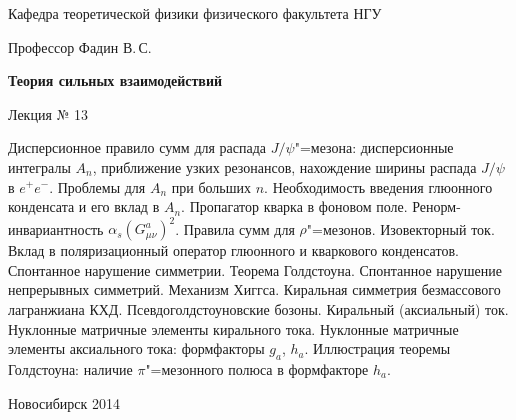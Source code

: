 \documentclass[12pt,pagesize,paper=landscape,paper=192mm:108mm]{scrbook}
\begin{document}
\begin{titlepage}
\begin{center}
    Кафедра теоретической физики физического факультета НГУ

    \large
    Профессор Фадин В.\,С.
    \vspace{-0.5em}

    \huge
    \textbf{Теория сильных взаимодействий}
    
    \Large
    Лекция № 13
    \vfill
    
    \normalsize
    \begin{minipage}{0.95\linewidth}
      \small Дисперсионное правило сумм для распада $J/\psi$"=мезона:
      дисперсионные интегралы $A_n$, приближение узких резонансов,
      нахождение ширины распада $J/\psi$ в $e^+e^-$. Проблемы для
      $A_n$ при больших $n$. Необходимость введения глюонного
      конденсата и его вклад в $A_n$. Пропагатор кварка в фоновом
      поле. Ренорм-инвариантность
      $\alpha_s\left(G^a_{\mu\nu}\right)^2$. Правила сумм для
      $\rho$"=мезонов. Изовекторный ток. Вклад в поляризационный оператор
      глюонного и кваркового конденсатов. Спонтанное нарушение
      симметрии. Теорема Голдстоуна. Спонтанное нарушение непрерывных
      симметрий. Механизм Хиггса. Киральная симметрия безмассового
      лагранжиана КХД. Псевдоголдстоуновские бозоны. Киральный
      (аксиальный) ток. Нуклонные матричные элементы кирального
      тока. Нуклонные матричные элементы аксиального тока: формфакторы
      $g_a$, $h_a$. Иллюстрация теоремы Голдстоуна: наличие $\pi$"=мезонного
      полюса в формфакторе $h_a$.
    \end{minipage}
    \vfill
    
    \normalsize \ccbysa\hspace{0.5em} Новосибирск 2014   
  \end{center}
\end{titlepage}
\end{document}
